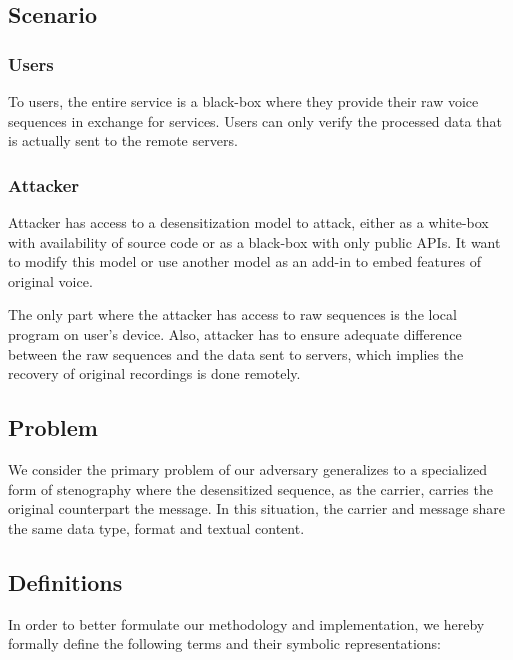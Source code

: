 \documentclass[journal]{IEEEtran} %
\begin{document}
\subsection{Scenario}

\subsubsection{Users}

To users, the entire service is a black-box where they provide their raw voice sequences in exchange for services. Users can only verify the processed data that is actually sent to the remote servers.

\subsubsection{Attacker}

Attacker has access to a desensitization model to attack, either as a white-box with availability of source code or as a black-box with only public APIs. It want to modify this model or use another model as an add-in to embed features of original voice.

The only part where the attacker has access to raw sequences is the local program on user's device. Also, attacker has to ensure adequate difference between the raw sequences and the data sent to servers, which implies the recovery of original recordings is done remotely.

\subsection{Problem}

We consider the primary problem of our adversary generalizes to a specialized form of stenography where the desensitized sequence, as the carrier, carries the original counterpart the message. In this situation, the carrier and message share the same data type, format and textual content.

\subsection{Definitions}

In order to better formulate our methodology and implementation, we hereby formally define the following terms and their symbolic representations:
\end{document}
